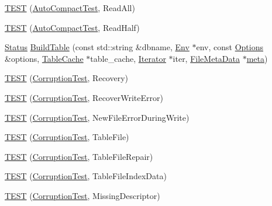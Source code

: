 \begin{DoxyCompactItemize}
\item 
\mbox{\hyperlink{namespaceleveldb_a9c4f7d5038dfc2985100b60ae2549fde}{T\+E\+ST}} (\mbox{\hyperlink{classleveldb_1_1_auto_compact_test}{Auto\+Compact\+Test}}, Read\+All)
\item 
\mbox{\hyperlink{namespaceleveldb_a404a4db88f6b45942b1945a996858a62}{T\+E\+ST}} (\mbox{\hyperlink{classleveldb_1_1_auto_compact_test}{Auto\+Compact\+Test}}, Read\+Half)
\item 
\mbox{\hyperlink{classleveldb_1_1_status}{Status}} \mbox{\hyperlink{namespaceleveldb_a10e102da98819e1a1f9b254241482e65}{Build\+Table}} (const std\+::string \&dbname, \mbox{\hyperlink{classleveldb_1_1_env}{Env}} $\ast$env, const \mbox{\hyperlink{structleveldb_1_1_options}{Options}} \&options, \mbox{\hyperlink{classleveldb_1_1_table_cache}{Table\+Cache}} $\ast$table\+\_\+cache, \mbox{\hyperlink{classleveldb_1_1_iterator}{Iterator}} $\ast$iter, \mbox{\hyperlink{structleveldb_1_1_file_meta_data}{File\+Meta\+Data}} $\ast$\mbox{\hyperlink{repair_8cc_a6b8f1f5fc8f36aa1678fff8fa5aecd0b}{meta}})
\item 
\mbox{\hyperlink{namespaceleveldb_a46326658ffc04dd7509c4066082edb1f}{T\+E\+ST}} (\mbox{\hyperlink{classleveldb_1_1_corruption_test}{Corruption\+Test}}, Recovery)
\item 
\mbox{\hyperlink{namespaceleveldb_a22ecc0fbc7435947076320655c5e0265}{T\+E\+ST}} (\mbox{\hyperlink{classleveldb_1_1_corruption_test}{Corruption\+Test}}, Recover\+Write\+Error)
\item 
\mbox{\hyperlink{namespaceleveldb_a25dbda5a48ec782778d331e4ccb81b6b}{T\+E\+ST}} (\mbox{\hyperlink{classleveldb_1_1_corruption_test}{Corruption\+Test}}, New\+File\+Error\+During\+Write)
\item 
\mbox{\hyperlink{namespaceleveldb_a1da99cee14629599882010198aabfa2a}{T\+E\+ST}} (\mbox{\hyperlink{classleveldb_1_1_corruption_test}{Corruption\+Test}}, Table\+File)
\item 
\mbox{\hyperlink{namespaceleveldb_a9f03547489b40b6e76cd8fc8a116884a}{T\+E\+ST}} (\mbox{\hyperlink{classleveldb_1_1_corruption_test}{Corruption\+Test}}, Table\+File\+Repair)
\item 
\mbox{\hyperlink{namespaceleveldb_acdfa0365a941e8e01531a402e53ad325}{T\+E\+ST}} (\mbox{\hyperlink{classleveldb_1_1_corruption_test}{Corruption\+Test}}, Table\+File\+Index\+Data)
\item 
\mbox{\hyperlink{namespaceleveldb_a6214e0d0ebfaf716601f7a9571aa09ca}{T\+E\+ST}} (\mbox{\hyperlink{classleveldb_1_1_corruption_test}{Corruption\+Test}}, Missing\+Descriptor)

\end{DoxyCompactItemize}
